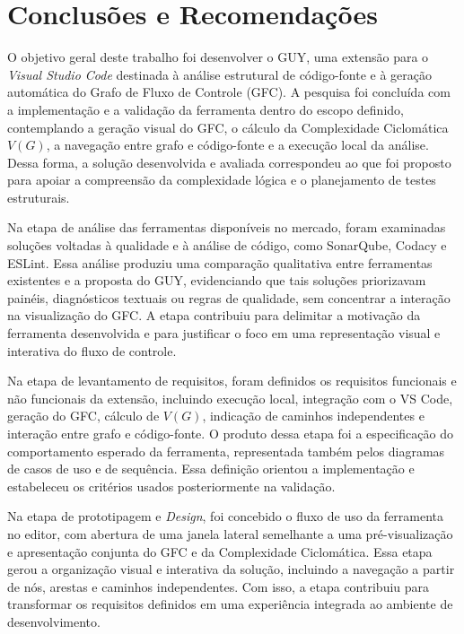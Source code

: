 \chapter{Conclusões e Recomendações}
\label{cap:05}

O objetivo geral deste trabalho foi desenvolver o GUY, uma extensão para o \textit{Visual Studio Code} destinada à análise estrutural de código-fonte e à geração automática do Grafo de Fluxo de Controle (GFC). A pesquisa foi concluída com a implementação e a validação da ferramenta dentro do escopo definido, contemplando a geração visual do GFC, o cálculo da Complexidade Ciclomática \(V(G)\), a navegação entre grafo e código-fonte e a execução local da análise. Dessa forma, a solução desenvolvida e avaliada correspondeu ao que foi proposto para apoiar a compreensão da complexidade lógica e o planejamento de testes estruturais.

Na etapa de análise das ferramentas disponíveis no mercado, foram examinadas soluções voltadas à qualidade e à análise de código, como SonarQube, Codacy e ESLint. Essa análise produziu uma comparação qualitativa entre ferramentas existentes e a proposta do GUY, evidenciando que tais soluções priorizavam painéis, diagnósticos textuais ou regras de qualidade, sem concentrar a interação na visualização do GFC. A etapa contribuiu para delimitar a motivação da ferramenta desenvolvida e para justificar o foco em uma representação visual e interativa do fluxo de controle.

Na etapa de levantamento de requisitos, foram definidos os requisitos funcionais e não funcionais da extensão, incluindo execução local, integração com o VS Code, geração do GFC, cálculo de \(V(G)\), indicação de caminhos independentes e interação entre grafo e código-fonte. O produto dessa etapa foi a especificação do comportamento esperado da ferramenta, representada também pelos diagramas de casos de uso e de sequência. Essa definição orientou a implementação e estabeleceu os critérios usados posteriormente na validação.

Na etapa de prototipagem e \textit{Design}, foi concebido o fluxo de uso da ferramenta no editor, com abertura de uma janela lateral semelhante a uma pré-visualização e apresentação conjunta do GFC e da Complexidade Ciclomática. Essa etapa gerou a organização visual e interativa da solução, incluindo a navegação a partir de nós, arestas e caminhos independentes. Com isso, a etapa contribuiu para transformar os requisitos definidos em uma experiência integrada ao ambiente de desenvolvimento.

